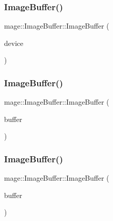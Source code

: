 \subsubsection{\texorpdfstring{Image\+Buffer()}{ImageBuffer()}\hspace{0.1cm}{\footnotesize\ttfamily [2/4]}}
{\footnotesize\ttfamily mage\+::\+Image\+Buffer\+::\+Image\+Buffer (\begin{DoxyParamCaption}\item[{I\+D3\+D11\+Device2 $\ast$}]{device }\end{DoxyParamCaption})\hspace{0.3cm}{\ttfamily [explicit]}}

\hypertarget{structmage_1_1_image_buffer_a2614d34f1f48db316a6a184706dc66fc}{}\label{structmage_1_1_image_buffer_a2614d34f1f48db316a6a184706dc66fc} 
\subsubsection{\texorpdfstring{Image\+Buffer()}{ImageBuffer()}\hspace{0.1cm}{\footnotesize\ttfamily [3/4]}}
{\footnotesize\ttfamily mage\+::\+Image\+Buffer\+::\+Image\+Buffer (\begin{DoxyParamCaption}\item[{const \hyperlink{structmage_1_1_image_buffer}{Image\+Buffer} \&}]{buffer }\end{DoxyParamCaption})\hspace{0.3cm}{\ttfamily [delete]}}

\hypertarget{structmage_1_1_image_buffer_a9e6a44d108113632cd333c7b76cdcefb}{}\label{structmage_1_1_image_buffer_a9e6a44d108113632cd333c7b76cdcefb} 
\subsubsection{\texorpdfstring{Image\+Buffer()}{ImageBuffer()}\hspace{0.1cm}{\footnotesize\ttfamily [4/4]}}
{\footnotesize\ttfamily mage\+::\+Image\+Buffer\+::\+Image\+Buffer (\begin{DoxyParamCaption}\item[{\hyperlink{structmage_1_1_image_buffer}{Image\+Buffer} \&\&}]{buffer }\end{DoxyParamCaption})\hspace{0.3cm}{\ttfamily [default]}}

